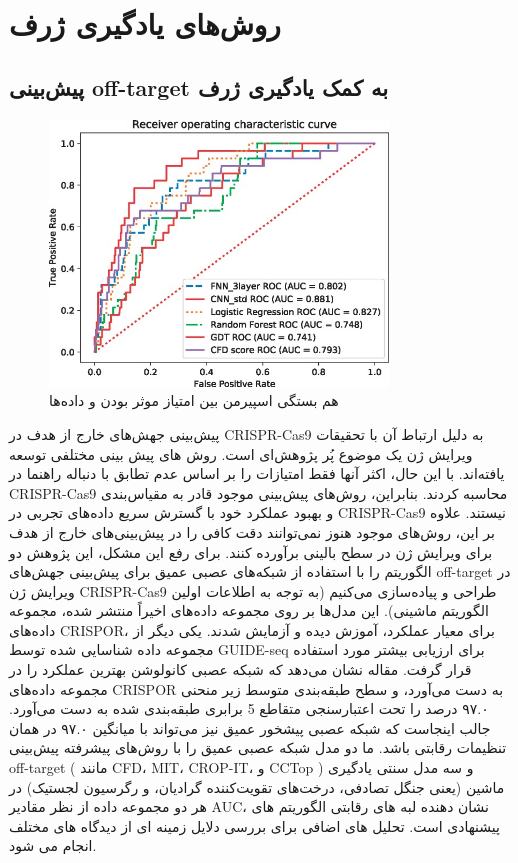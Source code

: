 \documentclass[12pt,a4paper,BCOR=.7cm,headsepline,bibliography=totoc]{report}
\begin{document}
\section{روش‌های یادگیری ژرف}
\subsection{پیش‌بینی off-target به کمک یادگیری ژرف}
\begin{figure}
\centering
\includegraphics[width=9cm, ]{pictures/DeepLearning.jpg}
\caption{
هم بستگی اسپیرمن بین امتیاز موثر بودن و داده‌ها ~\cite{chart}
}\label{wrap-fig:4}
\end{figure}
پیش‌بینی جهش‌های خارج از هدف در CRISPR-Cas9 به دلیل ارتباط آن با تحقیقات ویرایش ژن یک موضوع پُر پژوهش‌ای است. روش های پیش بینی مختلفی توسعه یافته‌اند. با این حال، اکثر آنها فقط امتیازات را بر اساس عدم تطابق با دنباله راهنما در CRISPR-Cas9 محاسبه کردند. بنابراین، روش‌های پیش‌بینی موجود قادر به مقیاس‌بندی و بهبود عملکرد خود با گسترش سریع داده‌های تجربی در CRISPR-Cas9 نیستند. علاوه بر این، روش‌های موجود هنوز نمی‌توانند دقت کافی را در پیش‌بینی‌های خارج از هدف برای ویرایش ژن در سطح بالینی برآورده کنند. برای رفع این مشکل، این پژوهش دو الگوریتم را با استفاده از شبکه‌های عصبی عمیق برای پیش‌بینی جهش‌های off-target در ویرایش ژن CRISPR-Cas9 طراحی و پیاده‌سازی می‌کنیم (به توجه به اطلاعات اولین الگوریتم ماشینی). این مدل‌ها بر روی مجموعه داده‌های اخیراً منتشر شده، مجموعه داده‌های CRISPOR، برای معیار عملکرد، آموزش دیده و آزمایش شدند. یکی دیگر از مجموعه داده شناسایی شده توسط GUIDE-seq برای ارزیابی بیشتر مورد استفاده قرار گرفت. مقاله نشان می‌دهد که شبکه عصبی کانولوشن بهترین عملکرد را در مجموعه داده‌های CRISPOR به دست می‌آورد، و سطح طبقه‌بندی متوسط ​​زیر منحنی ۹۷.۰ درصد را تحت اعتبارسنجی متقاطع 5 برابری طبقه‌بندی شده به دست می‌آورد. جالب اینجاست که شبکه عصبی پیشخور عمیق نیز می‌تواند با میانگین ۹۷.۰ در همان تنظیمات رقابتی باشد. ما دو مدل شبکه عصبی عمیق را با روش‌های پیشرفته پیش‌بینی off-target ( مانند CFD، MIT، CROP-IT، و CCTop ) و سه مدل سنتی یادگیری ماشین (یعنی جنگل تصادفی، درخت‌های تقویت‌کننده گرادیان، و رگرسیون لجستیک) در هر دو مجموعه داده از نظر مقادیر AUC، نشان دهنده لبه های رقابتی الگوریتم های پیشنهادی است. تحلیل های اضافی برای بررسی دلایل زمینه ای از دیدگاه های مختلف انجام می شود.
\end{document}
